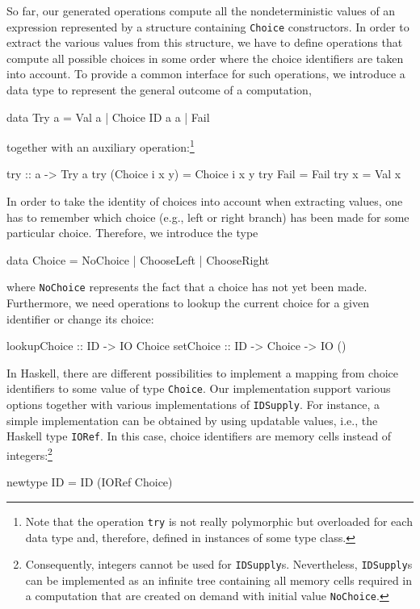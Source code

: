 \documentclass{llncs}
\newcommand{\code}[1]{\mbox{\small\texttt{#1}}}
\begin{document}
So far, our generated operations compute all the nondeterministic
values of an expression represented by a structure containing
\code{Choice} constructors. In order to extract the various
values from this structure, we have to define operations
that compute all possible choices in some order where the choice identifiers
are taken into account.
To provide a common interface for such operations, we introduce
a data type to represent the general outcome of a computation,
\begin{haskell}
  data Try a = Val a | Choice ID a a | Fail
\end{haskell}
together with an auxiliary operation:\footnote{Note that the
operation \code{try} is not really polymorphic but overloaded
for each data type and, therefore, defined in instances of some type class.}
\begin{haskell}
  try :: a -> Try a
  try (Choice i x y) = Choice i x y
  try Fail           = Fail
  try x              = Val x
\end{haskell}
In order to take the identity of choices into account when extracting values,
one has to remember which choice (e.g., left or right branch)
has been made for some particular choice.
Therefore, we introduce the type
\begin{haskell}
  data Choice = NoChoice | ChooseLeft | ChooseRight
\end{haskell}
where \code{NoChoice} represents the fact that a choice has not yet been made.
Furthermore, we need operations to lookup the current choice
for a given identifier or change its choice:
\begin{haskell}
  lookupChoice :: ID -> IO Choice
  setChoice    :: ID -> Choice -> IO ()
\end{haskell}
In Haskell, there are different possibilities to implement a mapping
from choice identifiers to some value of type \code{Choice}.
Our implementation support various options together with various
implementations of \code{IDSupply}.
For instance, a simple implementation can be obtained by
using updatable values, i.e., the Haskell type \code{IORef}.
In this case, choice identifiers are memory cells instead of integers:\footnote{%
Consequently, integers cannot be used for \code{IDSupply}s. Nevertheless,
\code{IDSupply}s can be implemented as an infinite tree containing
all memory cells required in a computation that are created
on demand with initial value \code{NoChoice}.}
\begin{haskell}
  newtype ID = ID (IORef Choice)
\end{haskell}
\end{document}
